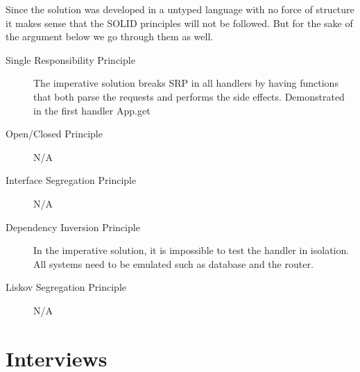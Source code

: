 Since the solution was developed in a untyped language with no force of
structure it makes sense that the SOLID principles will not be followed. But
for the sake of the argument below we go through them as well.

\begin{description}
	\item[Single Responsibility Principle] The imperative solution breaks SRP
in all handlers by having functions that both parse the requests and performs
the side effects. Demonstrated in the first handler App.get
	\item[Open/Closed Principle] N/A
	\item[Interface Segregation Principle] N/A
	\item[Dependency Inversion Principle] In the imperative solution, it is 
impossible to test the handler in isolation. All systems need to be emulated
such as database and the router.
	\item[Liskov Segregation Principle] N/A
\end{description}

\section{Interviews}

